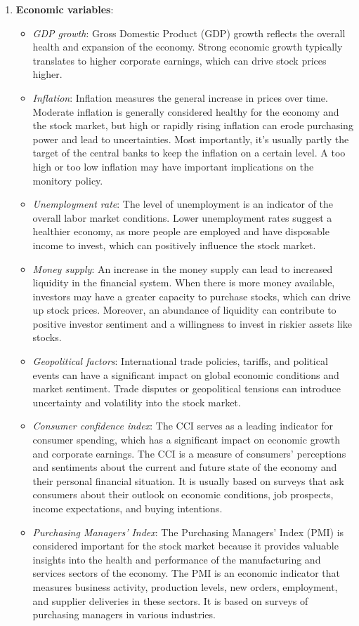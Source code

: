 \begin{enumerate}
	\item \textbf{Economic variables}: 
	\begin{itemize}
		\item \textit{GDP growth}: Gross Domestic Product (GDP) growth reflects the overall health and expansion of the economy. Strong economic growth typically translates to higher corporate earnings, which can drive stock prices higher.
		\item \textit{Inflation}: Inflation measures the general increase in prices over time. Moderate inflation is generally considered healthy for the economy and the stock market, but high or rapidly rising inflation can erode purchasing power and lead to uncertainties. Most importantly, it's usually  partly the target of the central banks to keep the inflation on a certain level. A too high or too low inflation may have important implications on the monitory policy. 
		\item \textit{Unemployment rate}: The level of unemployment is an indicator of the overall labor market conditions. Lower unemployment rates suggest a healthier economy, as more people are employed and have disposable income to invest, which can positively influence the stock market.
		\item \textit{Money supply}: An increase in the money supply can lead to increased liquidity in the financial system. When there is more money available, investors may have a greater capacity to purchase stocks, which can drive up stock prices. Moreover, an abundance of liquidity can contribute to positive investor sentiment and a willingness to invest in riskier assets like stocks.
		\item \textit{Geopolitical factors}: International trade policies, tariffs, and political events can have a significant impact on global economic conditions and market sentiment. Trade disputes or geopolitical tensions can introduce uncertainty and volatility into the stock market.
		\item \textit{Consumer confidence index}: The CCI serves as a leading indicator for consumer spending, which has a significant impact on economic growth and corporate earnings. The CCI is a measure of consumers' perceptions and sentiments about the current and future state of the economy and their personal financial situation. It is usually based on surveys that ask consumers about their outlook on economic conditions, job prospects, income expectations, and buying intentions.
		\item \textit{Purchasing Managers' Index}: The Purchasing Managers' Index (PMI) is considered important for the stock market because it provides valuable insights into the health and performance of the manufacturing and services sectors of the economy. The PMI is an economic indicator that measures business activity, production levels, new orders, employment, and supplier deliveries in these sectors. It is based on surveys of purchasing managers in various industries.

\end{itemize}
\end{enumerate}
